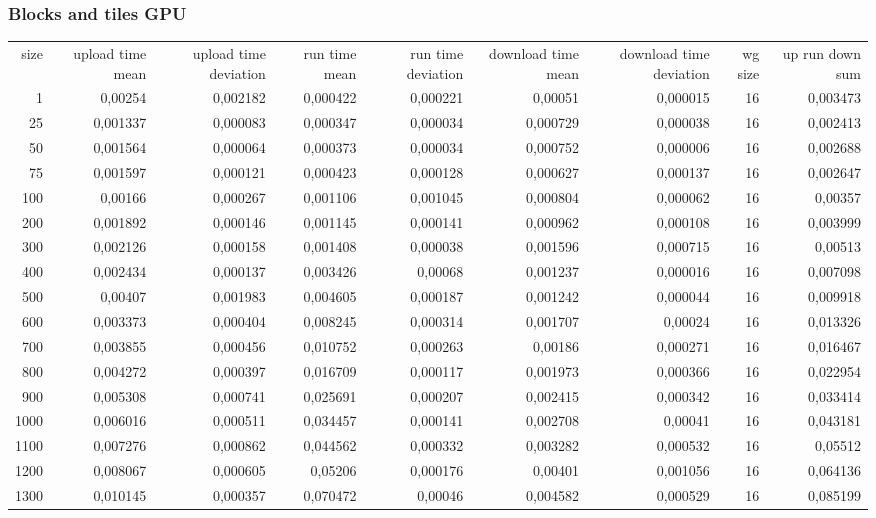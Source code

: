 \subsubsection{Blocks and tiles GPU}

\begin{tabular}{r r r r r r r r r}
size & upload time mean  & upload time deviation & run time mean & run time deviation & download time mean & download time deviation & wg size & up run down sum \\
1 & 0,00254 & 0,002182 & 0,000422 & 0,000221 & 0,00051 & 0,000015 & 16 & 0,003473 \\
25 & 0,001337 & 0,000083 & 0,000347 & 0,000034 & 0,000729 & 0,000038 & 16 & 0,002413 \\
50 & 0,001564 & 0,000064 & 0,000373 & 0,000034 & 0,000752 & 0,000006 & 16 & 0,002688 \\
75 & 0,001597 & 0,000121 & 0,000423 & 0,000128 & 0,000627 & 0,000137 & 16 & 0,002647 \\
100 & 0,00166 & 0,000267 & 0,001106 & 0,001045 & 0,000804 & 0,000062 & 16 & 0,00357 \\
200 & 0,001892 & 0,000146 & 0,001145 & 0,000141 & 0,000962 & 0,000108 & 16 & 0,003999 \\
300 & 0,002126 & 0,000158 & 0,001408 & 0,000038 & 0,001596 & 0,000715 & 16 & 0,00513 \\
400 & 0,002434 & 0,000137 & 0,003426 & 0,00068 & 0,001237 & 0,000016 & 16 & 0,007098 \\
500 & 0,00407 & 0,001983 & 0,004605 & 0,000187 & 0,001242 & 0,000044 & 16 & 0,009918 \\
600 & 0,003373 & 0,000404 & 0,008245 & 0,000314 & 0,001707 & 0,00024 & 16 & 0,013326 \\
700 & 0,003855 & 0,000456 & 0,010752 & 0,000263 & 0,00186 & 0,000271 & 16 & 0,016467 \\
800 & 0,004272 & 0,000397 & 0,016709 & 0,000117 & 0,001973 & 0,000366 & 16 & 0,022954 \\
900 & 0,005308 & 0,000741 & 0,025691 & 0,000207 & 0,002415 & 0,000342 & 16 & 0,033414 \\
1000 & 0,006016 & 0,000511 & 0,034457 & 0,000141 & 0,002708 & 0,00041 & 16 & 0,043181 \\
1100 & 0,007276 & 0,000862 & 0,044562 & 0,000332 & 0,003282 & 0,000532 & 16 & 0,05512 \\
1200 & 0,008067 & 0,000605 & 0,05206 & 0,000176 & 0,00401 & 0,001056 & 16 & 0,064136 \\
1300 & 0,010145 & 0,000357 & 0,070472 & 0,00046 & 0,004582 & 0,000529 & 16 & 0,085199 \\

\end{tabular}
